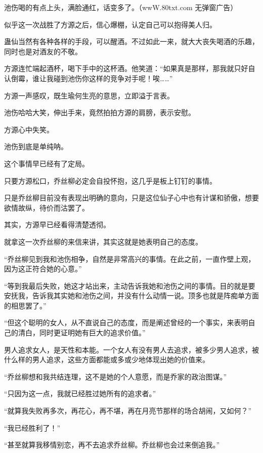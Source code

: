 
\begin{this_body}

池伤喝的有点上头，满脸通红，话变多了。（wwW.80txt.com 无弹窗广告）

似乎这一次战胜了方源之后，信心爆棚，认定自己可以抱得美人归。

蛊仙当然有各种各样的手段，可以醒酒。不过如此一来，就大大丧失喝酒的乐趣，同时也是对酒友的不敬。

方源连忙端起酒杯，喝下手中的这杯酒。他笑道：“如果真是那样，那我就只好自认倒霉，谁让我碰到池伤你这样的竞争对手呢！唉……”

方源一声感叹，既生瑜何生亮的意思，立即溢于言表。

池伤哈哈大笑，伸出手来，竟然拍拍方源的肩膀，表示安慰。

方源心中失笑。

池伤到底是单纯呐。

这个事情早已经有了定局。

只要方源松口，乔丝柳必定会自投怀抱，这几乎是板上钉钉的事情。

只是乔丝柳目前没有表现出明确的意向，只是这位仙子心中也有计谋和骄傲，想要欲情故纵，待价而沽罢了。

其实，方源早已经看得清楚透彻。

就拿这一次乔丝柳的来信来讲，其实这就是她表明自己的态度。

“乔丝柳见到我和池伤相争，自然是非常高兴的事情。在此之前，一直作壁上观，因为这正符合她的心意。”

“等到我最后失败，她这才站出来，主动告诉我她和池伤之间的事情。目的就是要安抚我，告诉我其实她和池伤之间，并没有什么动情一说。顶多也就是阵痴单方面的相思罢了。”

“但这个聪明的女人，从不直说自己的态度，而是阐述曾经的一个事实，来表明自己的清白，同时更证明她有巨大的追求价值。”

男人追求女人，是天性和本能。一个女人有没有男人去追求，被多少男人追求，被什么样的男人追求，这些方面都能或多或少地体现出她的价值来。

“乔丝柳想和我共结连理，这不是她的个人意愿，而是乔家的政治图谋。”

“只因为这一点，我就已经胜过她所有的追求者。”

“就算我失败再多次，再花心，再不堪，再在月亮节那样的场合胡闹，又如何？”

“我已经胜利了！”

“甚至就算我移情别恋，再不去追求乔丝柳。乔丝柳也会过来倒追我。”


\end{this_body}
